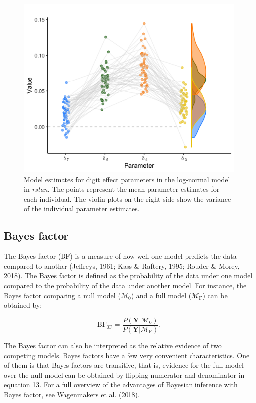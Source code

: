 \documentclass[
  english,
  doc,floatsintext]{apa6}
\begin{document}
\begin{figure}[H]

\includegraphics[width=0.75\linewidth]{I - Images/Fig15_inddiflogplot_onlyrstan_v2} \hfill{}

\caption{Model estimates for digit effect parameters in the log-normal model in \textit{rstan}. The points represent the mean parameter estimates for each individual. The violin plots on the right side show the variance of the individual parameter estimates.}\label{fig:modeldigitestplotlog}
\end{figure}

\hypertarget{bayes-factor}{%
\subsection{Bayes factor}\label{bayes-factor}}

The Bayes factor (BF) is a measure of how well one model predicts the data compared to another (Jeffreys, 1961; Kass \& Raftery, 1995; Rouder \& Morey, 2018). The Bayes factor is defined as the probability of the data under one model compared to the probability of the data under another model. For instance, the Bayes factor comparing a null model (\(\mathcal{M}_0\)) and a full model (\(\mathcal{M}_{\text{F}}\)) can be obtained by:

\begin{equation}
\text{BF}_{0\text{F}} = \frac{P(\bm{Y} | \mathcal{M}_0)}{P(\bm{Y} | \mathcal{M}_{\text{F}})}. 
\end{equation}

The Bayes factor can also be interpreted as the relative evidence of two competing models. Bayes factors have a few very convenient characteristics. One of them is that Bayes factors are transitive, that is, evidence for the full model over the null model can be obtained by flipping numerator and denominator in equation 13. For a full overview of the advantages of Bayesian inference with Bayes factor, see Wagenmakers et al. (2018).
\end{document}
